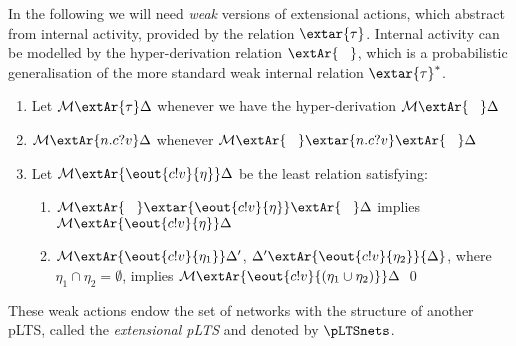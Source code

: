 \documentclass{LMCS}
\begin{document}
In the following we will need \emph{weak} versions of extensional actions, which
abstract from internal activity, 
provided by the relation $\extar{\tau}$. Internal activity can be modelled by 
the hyper-derivation relation $\extAr{\;\;\;}$, which is a probabilistic generalisation of 
the more standard weak internal relation $\extar{\tau}^{\ast}$. 

\begin{defi}\label{def:wea}
  \begin{enumerate}\item Let ${\mathcal M} \extAr{\tau} \Delta$ whenever we have the hyper-derivation 
        ${\mathcal M} \extAr{\;\;\;} \Delta$

  \item  ${\mathcal M} \extAr{n.c?v} \Delta$ whenever  ${\mathcal M} \extAr{\;\;\;}  \extar{n.c?v} \extAr{\;\;\;}  \Delta$

  \item Let ${\mathcal M} \extAr{\eout{c!v}{\eta}} \Delta$ be the least relation satisfying:
    \begin{enumerate}[label=(\alph*)]
    \item ${\mathcal M} \extAr{\;\;\;} \extar{\eout{c!v}{\eta}} \extAr{\;\;\;} \Delta$ implies ${\mathcal M} \extAr{\eout{c!v}{\eta}} \Delta$

   \item  ${\mathcal M} \extAr{\eout{c!v}{\eta_1}} \Delta'$,  $\Delta' \extAr{\eout{c!v}{\eta_2}} {\Delta}$, where 
            $\eta_1 \cap \eta_2 = \emptyset$, implies 
             ${\mathcal M} \extAr{\eout{c!v}{(\eta_1 \cup \eta_2)}} \Delta$  \qed
    \end{enumerate}
  \end{enumerate}
\end{defi}
\noindent
These weak actions endow the set of networks \nets with the structure
of another pLTS, called the \emph{extensional pLTS} and denoted by
$\pLTSnets$. 
\end{document}
